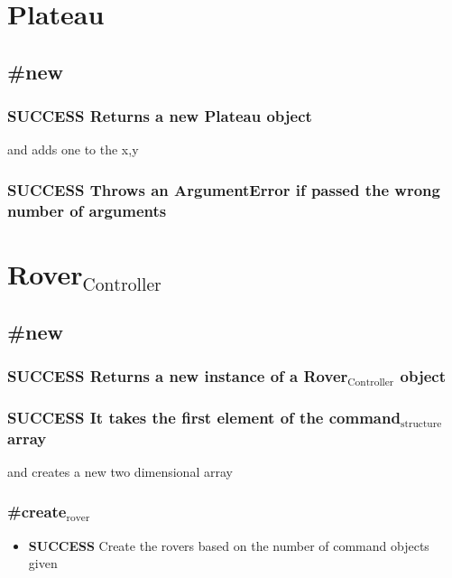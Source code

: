 \documentclass{article}
\begin{document}
\section{Plateau}
\label{sec-8}
\subsection{\#new}
\label{sec-8-1}
\subsubsection{\textbf{SUCCESS} Returns a new Plateau object}
\label{sec-8-1-1}

        and adds one to the x,y
\subsubsection{\textbf{SUCCESS} Throws an ArgumentError if passed the wrong number of arguments}
\label{sec-8-1-2}
\section{Rover$_{\mathrm{Controller}}$}
\label{sec-9}
\subsection{\#new}
\label{sec-9-1}
\subsubsection{\textbf{SUCCESS} Returns a new instance of a Rover$_{\mathrm{Controller}}$ object}
\label{sec-9-1-1}
\subsubsection{\textbf{SUCCESS} It takes the first element of the command$_{\mathrm{structure}}$ array}
\label{sec-9-1-2}

        and creates a new two dimensional array
\subsubsection{\#create$_{\mathrm{rover}}$}
\label{sec-9-1-3}
\begin{itemize}

\item \textbf{SUCCESS} Create the rovers based on the number of command objects given\\
\label{sec-9-1-3-1}%
\end{itemize} %
\end{document}
